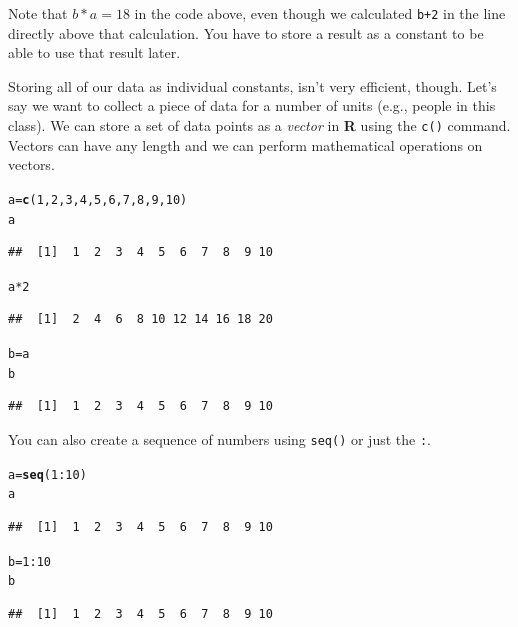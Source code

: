 \documentclass[12pt]{article}\usepackage[]{graphicx}\usepackage[]{color}
\makeatletter
\newcommand{\hlnum}[1]{\textcolor[rgb]{0.686,0.059,0.569}{#1}}%
\newcommand{\hlopt}[1]{\textcolor[rgb]{0,0,0}{#1}}%
\newcommand{\hlstd}[1]{\textcolor[rgb]{0.345,0.345,0.345}{#1}}%
\newcommand{\hlkwb}[1]{\textcolor[rgb]{0.69,0.353,0.396}{#1}}%
\newcommand{\hlkwd}[1]{\textcolor[rgb]{0.737,0.353,0.396}{\textbf{#1}}}%
\newenvironment{kframe}{%
 \def\at@end@of@kframe{}%
 \ifinner\ifhmode%
  \def\at@end@of@kframe{\end{minipage}}%
  \begin{minipage}{\columnwidth}%
 \fi\fi%
 \def\FrameCommand##1{\hskip\@totalleftmargin \hskip-\fboxsep
 \colorbox{shadecolor}{##1}\hskip-\fboxsep
     \hskip-\linewidth \hskip-\@totalleftmargin \hskip\columnwidth}%
 \MakeFramed {\advance\hsize-\width
   \@totalleftmargin\z@ \linewidth\hsize
   \@setminipage}}%
 {\par\unskip\endMakeFramed%
 \at@end@of@kframe}
\newenvironment{knitrout}{}{} %
\makeatother
\begin{document}
Note that $b*a=18$ in the code above, even though we calculated \verb|b+2| in the line directly above that calculation. You have to store a result as a constant to be able to use that result later.

Storing all of our data as individual constants, isn't very efficient, though. Let's say we want to collect a piece of data for a number of units (e.g., people in this class). We can store a set of data points as a \emph{vector} in \textbf{R} using the \verb|c()| command. Vectors can have any length and we can perform mathematical operations on vectors.

\begin{knitrout}
\color{fgcolor}\begin{kframe}
\begin{alltt}
\hlstd{a} \hlkwb{=} \hlkwd{c}\hlstd{(}\hlnum{1}\hlstd{,} \hlnum{2}\hlstd{,} \hlnum{3}\hlstd{,} \hlnum{4}\hlstd{,} \hlnum{5}\hlstd{,} \hlnum{6}\hlstd{,} \hlnum{7}\hlstd{,} \hlnum{8}\hlstd{,} \hlnum{9}\hlstd{,} \hlnum{10}\hlstd{)}
\hlstd{a}
\end{alltt}
\begin{verbatim}
##  [1]  1  2  3  4  5  6  7  8  9 10
\end{verbatim}
\begin{alltt}
\hlstd{a} \hlopt{*} \hlnum{2}
\end{alltt}
\begin{verbatim}
##  [1]  2  4  6  8 10 12 14 16 18 20
\end{verbatim}
\begin{alltt}
\hlstd{b} \hlkwb{=} \hlstd{a}
\hlstd{b}
\end{alltt}
\begin{verbatim}
##  [1]  1  2  3  4  5  6  7  8  9 10
\end{verbatim}
\end{kframe}
\end{knitrout}


You can also create a sequence of numbers using \verb|seq()| or just the \verb|:|.
\begin{knitrout}
\color{fgcolor}\begin{kframe}
\begin{alltt}
\hlstd{a} \hlkwb{=} \hlkwd{seq}\hlstd{(}\hlnum{1}\hlopt{:}\hlnum{10}\hlstd{)}
\hlstd{a}
\end{alltt}
\begin{verbatim}
##  [1]  1  2  3  4  5  6  7  8  9 10
\end{verbatim}
\begin{alltt}
\hlstd{b} \hlkwb{=} \hlnum{1}\hlopt{:}\hlnum{10}
\hlstd{b}
\end{alltt}
\begin{verbatim}
##  [1]  1  2  3  4  5  6  7  8  9 10
\end{verbatim}
\end{kframe}
\end{knitrout}
\end{document}
